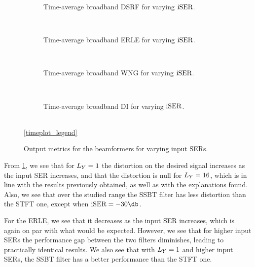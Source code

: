 
\begin{figure}[!t]
	\centering
	\begin{subfigure}{\textwidth}
		\centering
		
		\caption{Time-average broadband DSRF for varying $\text{iSER}$.}
		\label{subfig:lineplot__DSRF__iSER_var__err_0}
	\end{subfigure}\\[1em]
	\begin{subfigure}{\textwidth}
		\centering
		
		\caption{Time-average broadband ERLE for varying $\text{iSER}$.}
		\label{subfig:lineplot__ERLE__iSER_var__err_0}
	\end{subfigure}\\[1em]
	\begin{subfigure}{\textwidth}
		\centering
		
		\caption{Time-average broadband WNG for varying $\text{iSER}$.}
		\label{subfig:lineplot__WNG__iSER_var__err_0}
	\end{subfigure}\\[1em]
	\begin{subfigure}{\textwidth}
		\centering
		
		\caption{Time-average broadband DI for varying $\text{iSER}$.}
		\label{subfig:lineplot__DI__iSER_var__err_0}
	\end{subfigure}\\[1em]
	\ref*{timeplot_legend}
	\caption{Output metrics for the beamformers for varying input SERs.}
	\label{fig:lineplot__iSER_var__Ly_1__err_0}
\end{figure}

From \cref{subfig:lineplot__DSRF__iSER_var__err_0}, we see that for $\Ly = 1$ the distortion on the desired signal increases as the input SER increases, and that the distortion is null for $\Ly = 16$, which is in line with the results previously obtained, as well as with the explanations found. Also, we see that over the studied range the SSBT filter has less distortion than the STFT one, except when $\iser = -30\dB$.

For the ERLE, we see that it decreases as the input SER increases, which is again on par with what would be expected. However, we see that for higher input SERs the performance gap between the two filters diminishes, leading to practically identical results. We also see that with $\Ly = 1$ and higher input SERs, the SSBT filter has a better performance than the STFT one.

